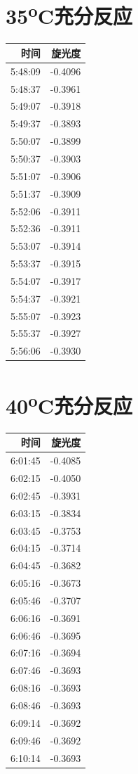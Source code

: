 \documentclass[11pt]{report}
\begin{document}
\section{35\textsuperscript{o}C充分反应}
\label{sec:org5706933}
\begin{center}
\begin{tabular}{rr}
时间 & 旋光度\\
\hline
5:48:09 & -0.4096\\
5:48:37 & -0.3961\\
5:49:07 & -0.3918\\
5:49:37 & -0.3893\\
5:50:07 & -0.3899\\
5:50:37 & -0.3903\\
5:51:07 & -0.3906\\
5:51:37 & -0.3909\\
5:52:06 & -0.3911\\
5:52:36 & -0.3911\\
5:53:07 & -0.3914\\
5:53:37 & -0.3915\\
5:54:07 & -0.3917\\
5:54:37 & -0.3921\\
5:55:07 & -0.3923\\
5:55:37 & -0.3927\\
5:56:06 & -0.3930\\
\end{tabular}
\end{center}
\section{40\textsuperscript{o}C充分反应}
\label{sec:org562596b}
\begin{center}
\begin{tabular}{rr}
时间 & 旋光度\\
\hline
6:01:45 & -0.4085\\
6:02:15 & -0.4050\\
6:02:45 & -0.3931\\
6:03:15 & -0.3834\\
6:03:45 & -0.3753\\
6:04:15 & -0.3714\\
6:04:45 & -0.3682\\
6:05:16 & -0.3673\\
6:05:46 & -0.3707\\
6:06:16 & -0.3691\\
6:06:46 & -0.3695\\
6:07:16 & -0.3694\\
6:07:46 & -0.3693\\
6:08:16 & -0.3693\\
6:08:46 & -0.3693\\
6:09:14 & -0.3692\\
6:09:46 & -0.3692\\
6:10:14 & -0.3693\\
\end{tabular}
\end{center}
\end{document}

